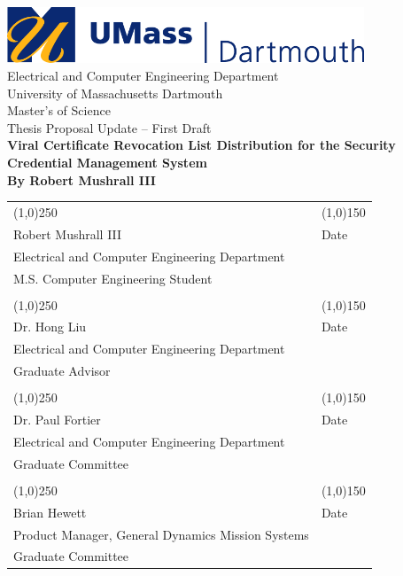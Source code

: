 \documentclass {article}
\begin{document}

\begin{titlepage}
	\centering
	\includegraphics[width=0.8\textwidth]{images/umd_logo.jpg} \\ \bigskip
	\LARGE{Electrical and Computer Engineering Department \\University of Massachusetts Dartmouth}\\
	\bigskip 
	\LARGE{Master's of Science \\ Thesis Proposal Update -- First Draft} \\
	\bigskip 
	\Huge{\bf Viral Certificate Revocation List Distribution for the Security Credential Management System} \\ \medskip
	\LARGE{\bf By Robert Mushrall III}

	\vfill
	\begin{table}[!hb]
		\centering
		\begin{tabular}{ l l }
			\line(1,0){250} & \line(1,0){150} \\
			\small{Robert Mushrall III}  & \small{Date} \\
			\small{Electrical and Computer Engineering Department} \\
			\small{M.S. Computer Engineering Student} & \\
			\vspace{.3cm} \\
			\line(1,0){250} & \line(1,0){150} \\
			\small{Dr. Hong Liu} & \small{Date} \\
			\small{Electrical and Computer Engineering Department} \\
			\small{Graduate Advisor} & \\
			\vspace{.3cm} \\
			\line(1,0){250} & \line(1,0){150} \\
			\small{Dr. Paul Fortier} & \small{Date} \\
			\small{Electrical and Computer Engineering Department} \\
			\small{Graduate Committee} & \\
			\vspace{.3cm} \\
			\line(1,0){250} & \line(1,0){150} \\
			\small{Brian Hewett} & \small{Date} \\
			\small{Product Manager, General Dynamics Mission Systems} \\
			\small{Graduate Committee} & \\
		\end{tabular}
	\end{table}
	\thispagestyle{empty}
\end{titlepage}
\setcounter{page}{2}
\end{document}
